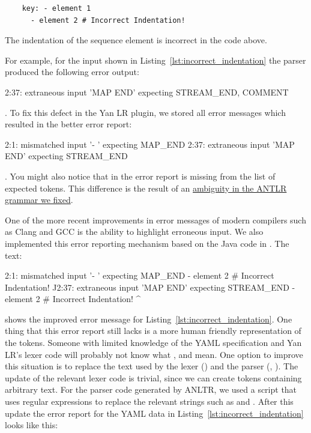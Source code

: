 \begin{listing}
  \begin{verbatim}
    key: - element 1
      - element 2 # Incorrect Indentation!
  \end{verbatim}
  \caption{The indentation of the sequence element  is incorrect in the code above.}
  \label{lst:incorrect_indentation}
\end{listing}

For example, for the input shown in Listing~\ref{lst:incorrect_indentation} the parser produced the following error output:

\begin{textcode}
  2:37: extraneous input 'MAP END' expecting {STREAM_END, COMMENT}
\end{textcode}

. To fix this defect in the Yan LR plugin, we stored all error messages which resulted in the better error report:

\begin{textcode}
  2:1: mismatched input '- ' expecting MAP_END
  2:37: extraneous input 'MAP END' expecting STREAM_END
\end{textcode}

. You might also notice that in the error report  is missing from the list of expected tokens. This difference is the result of an \href{https://github.com/ElektraInitiative/libelektra/commit/0fe4953}{ambiguity in the ANTLR grammar we fixed}.

One of the more recent improvements in error messages of modern compilers such as Clang and GCC is the ability to highlight erroneous input. We also implemented this error reporting mechanism based on the Java code in . The text:

\begin{textcode}
2:1: mismatched input '- ' expecting MAP_END
     - element 2 # Incorrect Indentation!
     ^^
2:37: extraneous input 'MAP END' expecting STREAM_END
      - element 2 # Incorrect Indentation!
                                          ^
\end{textcode}

shows the improved error message for Listing~\ref{lst:incorrect_indentation}. One thing that this error report still lacks is a more human friendly representation of the tokens. Someone with limited knowledge of the YAML specification and Yan LR’s lexer code will probably not know what ,  and  mean. One option to improve this situation is to replace the text used by the lexer () and the parser (, ). The update of the relevant lexer code is trivial, since we can create tokens containing arbitrary text. For the parser code generated by ANLTR, we used a script that uses regular expressions to replace the relevant strings such as  and . After this update the error report for the YAML data in Listing~\ref{lst:incorrect_indentation} looks like this:


